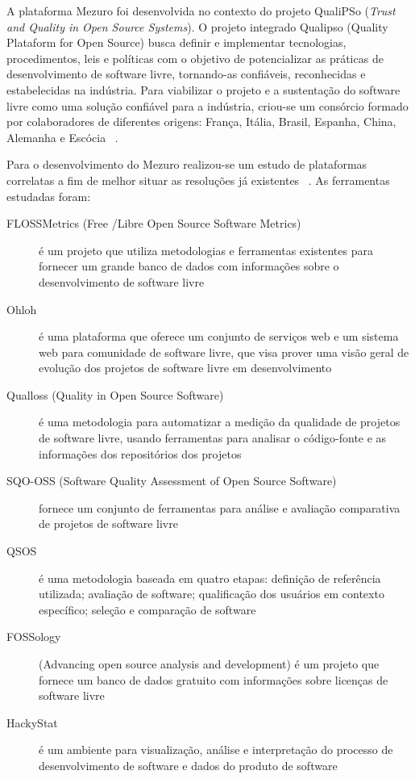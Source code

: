 A plataforma Mezuro foi desenvolvida no contexto do projeto QualiPSo (\textit{Trust and Quality in Open Source Systems}).
O projeto integrado Qualipso (Quality Plataform for Open Source) busca definir e implementar tecnologias, procedimentos, leis e políticas com o objetivo de potencializar as práticas de desenvolvimento de software livre, tornando-as confiáveis, reconhecidas e estabelecidas na indústria.
Para viabilizar o projeto e a sustentação do software livre como uma solução confiável para a indústria, criou-se um consórcio formado por colaboradores de diferentes origens: França, Itália, Brasil, Espanha, China, Alemanha e Escócia~\cite{qualipso2013}
.

Para o desenvolvimento do Mezuro realizou-se um estudo de plataformas correlatas a fim de melhor situar as resoluções já existentes~\cite{meirelles2013}%
. As ferramentas estudadas foram:

\begin{description}
\item[FLOSSMetrics (Free /Libre Open Source Software Metrics)]
é um projeto que utiliza metodologias e ferramentas existentes para fornecer um grande banco de dados com informações sobre o desenvolvimento de software livre
\item[Ohloh]
é uma plataforma que oferece um conjunto de serviços web e um sistema web para comunidade de software livre, que visa prover uma visão geral de evolução dos projetos de software livre em desenvolvimento
\item[Qualloss (Quality in Open Source Software)]
é uma metodologia para automatizar a medição da qualidade de projetos de software livre, usando ferramentas para analisar o código-fonte e as informações dos repositórios dos projetos
\item[SQO-OSS (Software Quality Assessment of Open Source Software)]
fornece um conjunto de ferramentas para análise e avaliação comparativa de projetos de software livre
\item[QSOS]
é uma metodologia baseada em quatro etapas: definição de referência utilizada; avaliação de software; qualificação dos usuários em contexto específico; seleção e comparação de software
\item[FOSSology]
(Advancing open source analysis and development) é um projeto que fornece um banco de dados gratuito com informações sobre licenças de software livre
\item[HackyStat]
é um ambiente para visualização, análise e interpretação do processo de desenvolvimento de software e dados do produto de software
\end{description}

